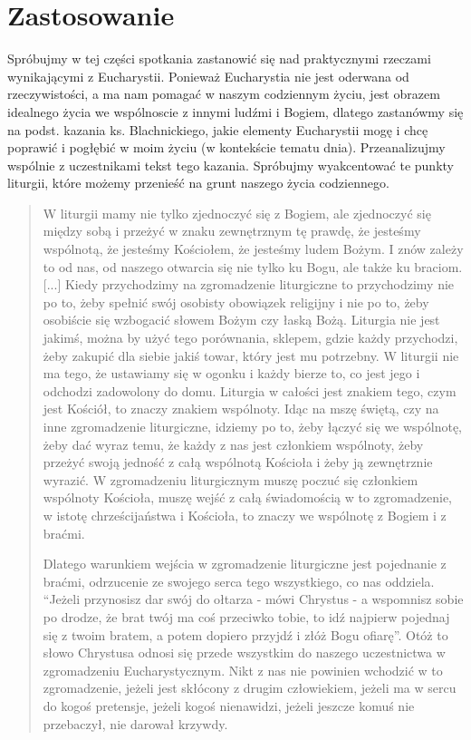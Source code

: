 \documentclass[a5paper,10pt,polish]{book}
\begin{document}
\section{Zastosowanie}
\label{babice2006-jesien-knurow/spotkanie3:zastosowanie}
Spróbujmy w tej części spotkania zastanowić się nad praktycznymi rzeczami wynikającymi z Eucharystii. Ponieważ Eucharystia nie jest oderwana od rzeczywistości, a ma nam pomagać w naszym codziennym życiu, jest obrazem idealnego życia we wspólnoscie z innymi ludźmi i Bogiem, dlatego zastanówmy się na podst. kazania ks. Blachnickiego, jakie elementy Eucharystii mogę i chcę poprawić i pogłębić w moim życiu (w kontekście tematu dnia). Przeanalizujmy wspólnie z uczestnikami tekst tego kazania. Spróbujmy wyakcentować te punkty liturgii, które możemy przenieść na grunt naszego życia codziennego.
\begin{quote}

W liturgii mamy nie tylko zjednoczyć się z Bogiem, ale zjednoczyć się między sobą i przeżyć w znaku zewnętrznym tę prawdę, że jesteśmy wspólnotą, że jesteśmy Kościołem, że jesteśmy ludem Bożym. I znów zależy to od nas, od naszego otwarcia się nie tylko ku Bogu, ale także ku braciom. {[}...{]} Kiedy przychodzimy na zgromadzenie liturgiczne to przychodzimy nie po to, żeby spełnić swój osobisty obowiązek religijny i nie po to, żeby osobiście się wzbogacić słowem Bożym czy łaską Bożą. Liturgia nie jest jakimś, można by użyć tego porównania, sklepem, gdzie każdy przychodzi, żeby zakupić dla siebie jakiś towar, który jest mu potrzebny. W liturgii nie ma tego, że ustawiamy się w ogonku i każdy bierze to, co jest jego i odchodzi zadowolony do domu. Liturgia w całości jest znakiem tego, czym jest Kościół, to znaczy znakiem wspólnoty. Idąc na mszę świętą, czy na inne zgromadzenie liturgiczne, idziemy po to, żeby łączyć się we wspólnotę, żeby dać wyraz temu, że każdy z nas jest członkiem wspólnoty, żeby przeżyć swoją jedność z całą wspólnotą Kościoła i żeby ją zewnętrznie wyrazić. W zgromadzeniu liturgicznym muszę poczuć się członkiem wspólnoty Kościoła, muszę wejść z całą świadomością w to zgromadzenie, w istotę chrześcijaństwa i Kościoła, to znaczy we wspólnotę z Bogiem i z braćmi.

Dlatego warunkiem wejścia w zgromadzenie liturgiczne jest pojednanie z braćmi, odrzucenie ze swojego serca tego wszystkiego, co nas oddziela. ``Jeżeli przynosisz dar swój do ołtarza - mówi Chrystus - a wspomnisz sobie po drodze, że brat twój ma coś przeciwko tobie, to idź najpierw pojednaj się z twoim bratem, a potem dopiero przyjdź i złóż Bogu ofiarę''. Otóż to słowo Chrystusa odnosi się przede wszystkim do naszego uczestnictwa w zgromadzeniu Eucharystycznym. Nikt z nas nie powinien wchodzić w to zgromadzenie, jeżeli jest skłócony z drugim człowiekiem, jeżeli ma w sercu do kogoś pretensje, jeżeli kogoś nienawidzi, jeżeli jeszcze komuś nie przebaczył, nie darował krzywdy.


\end{quote}
\end{document}
